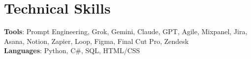 \section{Technical Skills}
\begin{itemize}[leftmargin=0.15in, label={}]
    \small{
      \item{
      \textbf{Tools}{: Prompt Engineering, Grok, Gemini, Claude, GPT, Agile, Mixpanel, Jira, Asana, Notion, Zapier, Loop, Figma, Final Cut Pro, Zendesk} \\
      \textbf{Languages}{: Python, C\#, SQL, HTML/CSS} \\
      }
    }
  \end{itemize}